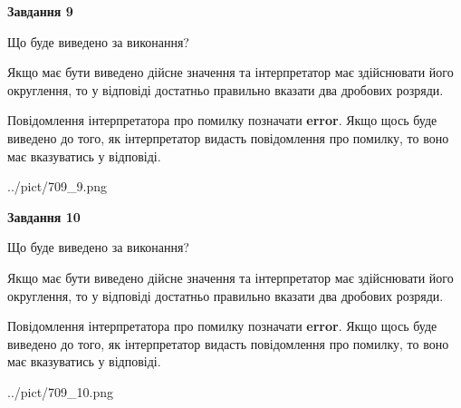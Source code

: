 \documentclass[12pt, ukrainian]{article}
\begin{document}
{\begin {Large}
{\begin {center}\textbf{Завдання 9}\end {center}}\par
Що буде виведено за виконання? \par

Якщо має бути виведено дійсне значення та інтерпретатор має здійснювати його округлення, 
то у відповіді достатньо правильно вказати два дробових розряди.

Повідомлення інтерпретатора про помилку позначати \textbf{error}.
Якщо щось буде виведено до того, як інтерпретатор видасть повідомлення про помилку, 
то воно має вказуватись у відповіді. \par

\begin{center}
	{../pict/709_9.png}
\end{center}
\newpage

{\begin {center}\textbf{Завдання 10}\end {center}}\par
Що буде виведено за виконання? \par

Якщо має бути виведено дійсне значення та інтерпретатор має здійснювати його округлення, 
то у відповіді достатньо правильно вказати два дробових розряди.

Повідомлення інтерпретатора про помилку позначати \textbf{error}.
Якщо щось буде виведено до того, як інтерпретатор видасть повідомлення про помилку, 
то воно має вказуватись у відповіді. \par

\begin{center}
	{../pict/709_10.png}
\end{center}
\newpage

\end {Large}}
\end{document}
